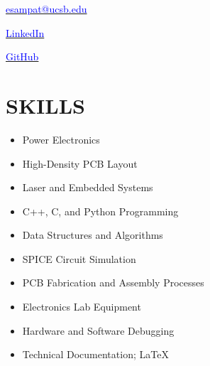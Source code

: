 

	\maketitle
	
	\begin{center}
		\begin{minipage}{0.33\textwidth}
			\centering \href{esampat@ucsb.edu}{\textcolor{blue}{esampat@ucsb.edu}}
		\end{minipage}%
		\begin{minipage}{0.33\textwidth}
			\centering \href{https://www.linkedin.com/in/erk-sampat-500331245/}{\textcolor{blue}{LinkedIn}}
		\end{minipage}%
		\begin{minipage}{0.33\textwidth}
			\centering \href{https://github.com/SAR-mango}{\textcolor{blue}{GitHub}}
		\end{minipage}
	\end{center}
	
	\section*{SKILLS}
	\begin{minipage}{0.5\textwidth}
		\centering
		\begin{itemize}
			\setlength \itemsep{0.1em}
			\item Power Electronics
			\item High-Density PCB Layout
			\item Laser and Embedded Systems
			\item C++, C, and Python Programming
			\item Data Structures and Algorithms
		\end{itemize}
	\end{minipage}%
	\begin{minipage}{0.5\textwidth}
		\centering
		\begin{itemize}
			\setlength \itemsep{0.1em}
			\item SPICE Circuit Simulation
			\item PCB Fabrication and Assembly Processes
			\item Electronics Lab Equipment
			\item Hardware and Software Debugging
			\item Technical Documentation; LaTeX
		\end{itemize}
	\end{minipage}
	
